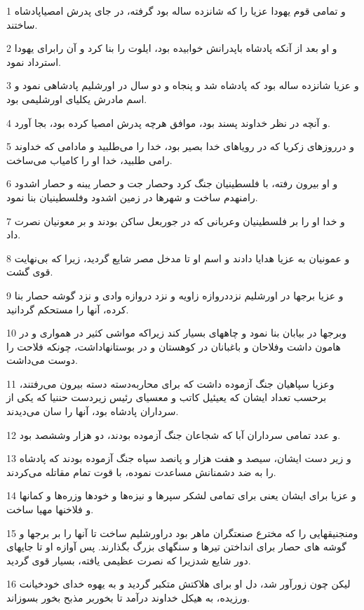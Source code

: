 \par 1 و تمامی قوم یهودا عزیا را که شانزده ساله بود گرفته، در جای پدرش امصیاپادشاه ساختند.
\par 2 و او بعد از آنکه پادشاه باپدرانش خوابیده بود، ایلوت را بنا کرد و آن رابرای یهودا استرداد نمود.
\par 3 و عزیا شانزده ساله بود که پادشاه شد و پنجاه و دو سال در اورشلیم پادشاهی نمود و اسم مادرش یکلیای اورشلیمی بود.
\par 4 و آنچه در نظر خداوند پسند بود، موافق هرچه پدرش امصیا کرده بود، بجا آورد.
\par 5 و درروزهای زکریا که در رویاهای خدا بصیر بود، خدا را می‌طلبید و مادامی که خداوند رامی طلبید، خدا او را کامیاب می‌ساخت.
\par 6 و او بیرون رفته، با فلسطینیان جنگ کرد وحصار جت و حصار یبنه و حصار اشدود رامنهدم ساخت و شهرها در زمین اشدود وفلسطینیان بنا نمود.
\par 7 و خدا او را بر فلسطینیان وعربانی که در جوربعل ساکن بودند و بر معونیان نصرت داد.
\par 8 و عمونیان به عزیا هدایا دادند و اسم او تا مدخل مصر شایع گردید، زیرا که بی‌نهایت قوی گشت.
\par 9 و عزیا برجها در اورشلیم نزددروازه زاویه و نزد دروازه وادی و نزد گوشه حصار بنا کرده، آنها را مستحکم گردانید.
\par 10 وبرجها در بیابان بنا نمود و چاههای بسیار کند زیراکه مواشی کثیر در همواری و در هامون داشت وفلاحان و باغبانان در کوهستان و در بوستانهاداشت، چونکه فلاحت را دوست می‌داشت.
\par 11 وعزیا سپاهیان جنگ آزموده داشت که برای محاربه‌دسته دسته بیرون می‌رفتند، برحسب تعداد ایشان که یعیئیل کاتب و معسیای رئیس زیردست حننیا که یکی از سرداران پادشاه بود، آنها را سان می‌دیدند.
\par 12 و عدد تمامی سرداران آبا که شجاعان جنگ آزموده بودند، دو هزار وششصد بود.
\par 13 و زیر دست ایشان، سیصد و هفت هزار و پانصد سپاه جنگ آزموده بودند که پادشاه را به ضد دشمنانش مساعدت نموده، با قوت تمام مقاتله می‌کردند.
\par 14 و عزیا برای ایشان یعنی برای تمامی لشکر سپرها و نیزه‌ها و خودها وزره‌ها و کمانها و فلاخنها مهیا ساخت.
\par 15 ومنجنیقهایی را که مخترع صنعتگران ماهر بود دراورشلیم ساخت تا آنها را بر برجها و گوشه های حصار برای انداختن تیرها و سنگهای بزرگ بگذارند. پس آوازه او تا جایهای دور شایع شدزیرا که نصرت عظیمی یافته، بسیار قوی گردید.
\par 16 لیکن چون زورآور شد، دل او برای هلاکتش متکبر گردید و به یهوه خدای خودخیانت ورزیده، به هیکل خداوند درآمد تا بخوربر مذبح بخور بسوزاند.

